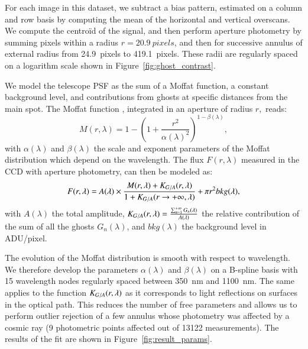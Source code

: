For each image in this dataset, we subtract a bias pattern, estimated on a column and row basis by computing the mean of the horizontal and vertical overscans. We compute the centroïd of the signal, and then perform aperture photometry by summing pixels within a radius $r=\SI{20.9}{pixels}$, and then for successive annulus of external radius from \SI{24.9}{pixels} to \SI{419.1}{pixels}. These radii are regularly spaced on a logarithm scale shown in Figure~\ref{fig:ghost_contrast}.

We model the \SD telescope PSF as the sum of a Moffat function, a constant background level, and contributions from ghosts at specific distances from the main spot. The Moffat function \citep{moffat}, integrated in an aperture of radius $r,$ reads:
\begin{equation}
M(r, \lambda)= 1 - \left( 1+\frac{r^2}{\alpha(\lambda)^2} \right)^{1-\beta(\lambda)},
\end{equation}
with $\alpha(\lambda)$ and $\beta(\lambda)$ the scale and exponent parameters of the Moffat distribution which depend on the wavelength. The flux $F(r, \lambda)$ measured in the CCD with aperture photometry, can then be modeled as: 
\begin{equation}
F(r, \lambda) = A(\lambda) \times \frac{M(r, \lambda) + K_{G/A}(r, \lambda)}{1 + K_{G/A}(r \rightarrow +\infty, \lambda)} + \pi r^2 bkg(\lambda),
\label{eq:moffat_model}
\end{equation}
with $A(\lambda)$ the total amplitude, $K_{G/A}(r, \lambda) = \frac{\sum_{n=1}^{+\infty} G_n(\lambda)}{A(\lambda)}$ the relative contribution of the sum of all the ghosts $G_n(\lambda)$, and $bkg(\lambda)$ the background level in ADU/pixel. 

The evolution of the Moffat distribution is smooth with respect to wavelength. We therefore develop the parameters $\alpha(\lambda)$ and $\beta(\lambda)$  on a B-spline basis with 15 wavelength nodes regularly spaced between \SI{350}{\nano\meter} and \SI{1100}{\nano\meter}. The same applies to the function $K_{G/A}(r, \lambda)$ as it corresponds to light reflections on surfaces in the optical path. This reduces the number of free parameters and allows us to perform outlier rejection of a few annulus whose photometry was affected by a cosmic ray (9 photometric points affected out of 13122 measurements). The results of the fit are shown in Figure~\ref{fig:result_params}. 


